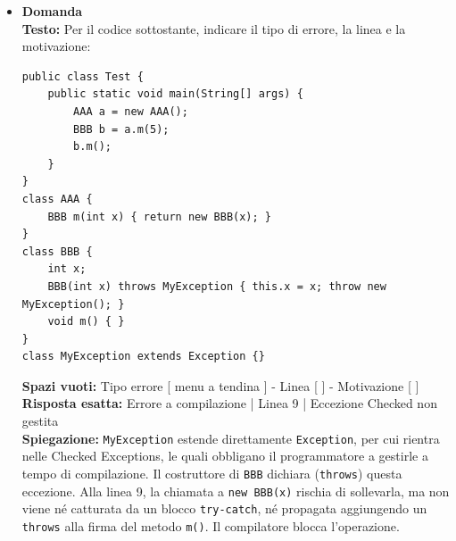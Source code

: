 \documentclass[12pt, a4paper]{article}
\begin{document}
\begin{itemize}
    \item {}\textbf{Domanda \thedomanda} \\
    \textbf{Testo:} Per il codice sottostante, indicare il tipo di errore, la linea e la motivazione:
\begin{verbatim}
public class Test {
    public static void main(String[] args) {
        AAA a = new AAA();
        BBB b = a.m(5);
        b.m();
    }
}
class AAA {
    BBB m(int x) { return new BBB(x); }
}
class BBB {
    int x;
    BBB(int x) throws MyException { this.x = x; throw new MyException(); }
    void m() { }
}
class MyException extends Exception {}
\end{verbatim}
    \textbf{Spazi vuoti:} Tipo errore [ menu a tendina ] - Linea [ \hspace{1cm} ] - Motivazione [ \hspace{1cm} ] \\
    \textbf{Risposta esatta:} Errore a compilazione | Linea 9 | Eccezione Checked non gestita \\
    \textbf{Spiegazione:} \texttt{MyException} estende direttamente \texttt{Exception}, per cui rientra nelle Checked Exceptions, le quali obbligano il programmatore a gestirle a tempo di compilazione. Il costruttore di \texttt{BBB} dichiara (\texttt{throws}) questa eccezione. Alla linea 9, la chiamata a \texttt{new BBB(x)} rischia di sollevarla, ma non viene né catturata da un blocco \texttt{try-catch}, né propagata aggiungendo un \texttt{throws} alla firma del metodo \texttt{m()}. Il compilatore blocca l'operazione.
    \vspace{0.5cm}

\newpage


\end{itemize}
\end{document}
